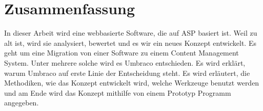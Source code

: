 \chapter*{Zusammenfassung}
In dieser Arbeit wird eine webbasierte Software, die auf ASP basiert ist. Weil zu alt ist, wird sie analysiert, bewertet und es wir ein neues Konzept entwickelt. Es geht um eine Migration von einer Software zu einem Content Management System. Unter mehrere solche wird es Umbraco entschieden. Es wird erklärt, warum Umbraco auf erste Linie der Entscheidung steht. Es wird erläutert, die Methodiken, wie das Konzept entwickelt wird, welche Werkzeuge benutzt werden und am Ende wird das Konzept mithilfe von einem Prototyp Programm angegeben. 
